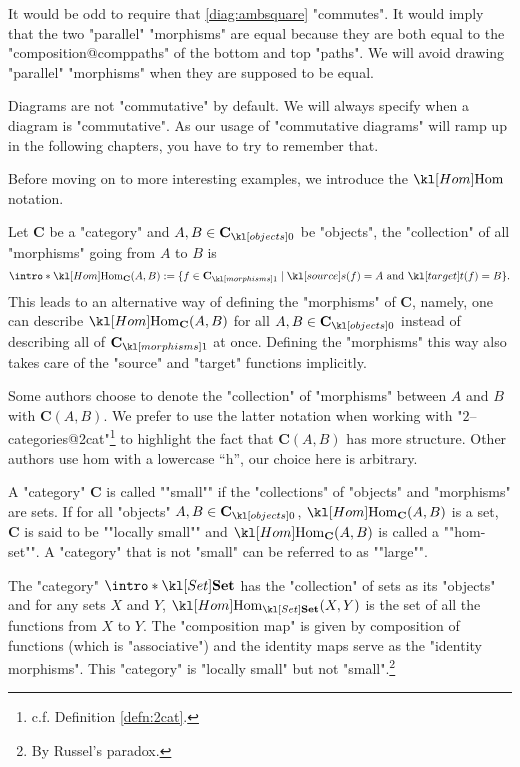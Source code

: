 \documentclass[main.tex]{subfiles}
\begin{document}
\begin{exmps}
	It would be odd to require that \eqref{diag:ambsquare} "commutes". It would imply that the two "parallel" "morphisms" are equal because they are both equal to the "composition@comppaths" of the bottom and top "paths". We will avoid drawing "parallel" "morphisms" when they are supposed to be equal.
\end{exmps}
\begin{warn}
	Diagrams are not "commutative" by default. We will always specify when a diagram is "commutative". As our usage of "commutative diagrams" will ramp up in the following chapters, you have to try to remember that. 
\end{warn}

Before moving on to more interesting examples, we introduce the $\Hom$ notation.
\begin{defn}[$\Hom$]
	\AP Let $\mathbf{C}$ be a "category" and $A,B \in \obj{\mathbf{C}}$ be "objects", the "collection" of all "morphisms" going from $A$ to $B$ is 
	\[\intro*\Hom_{\mathbf{C}}(A,B) := \{f \in \mor{\mathbf{C}} \mid \source(f) = A \text{ and } \target(f) = B\}.\]
	This leads to an alternative way of defining the "morphisms" of $\mathbf{C}$, namely, one can describe $\Hom_{\mathbf{C}}(A,B)$ for all $A, B \in \obj{\mathbf{C}}$ instead of describing all of $\mor{\mathbf{C}}$ at once. Defining the "morphisms" this way also takes care of the "source" and "target" functions implicitly.
\end{defn}
\begin{rem}[Notation]
    Some authors choose to denote the "collection" of "morphisms" between $A$ and $B$ with $\mathbf{C}(A,B)$. We prefer to use the latter notation when working with "$2$--categories@2cat"\footnote{c.f. Definition \ref{defn:2cat}.} to highlight the fact that $\mathbf{C}(A,B)$ has more structure. Other authors use $\mathrm{hom}$ with a lowercase ``h'', our choice here is arbitrary.
\end{rem}
\begin{defn}[Smallness]
	\AP A "category" $\mathbf{C}$ is called ""small"" if the "collections" of "objects" and "morphisms" are sets. \AP If for all "objects" $A,B \in \obj{\mathbf{C}}$, $\Hom_{\mathbf{C}}(A,B)$ is a set, $\mathbf{C}$ is said to be ""locally small"" and $\Hom_{\mathbf{C}}(A,B)$ is called a ""hom-set"". \AP A "category" that is not "small" can be referred to as ""large"".%
\end{defn}
\begin{exmp}[$\catSet$]
	\AP The "category" $\intro*\catSet$ has the "collection" of sets as its "objects" and for any sets $X$ and $Y$, $\Hom_{\catSet}(X,Y)$ is the set of all the functions from $X$ to $Y$. The "composition map" is given by composition of functions (which is "associative") and the identity maps serve as the "identity morphisms". This "category" is "locally small" but not "small".\footnote{By Russel's paradox.}
\end{exmp}
\end{document}
